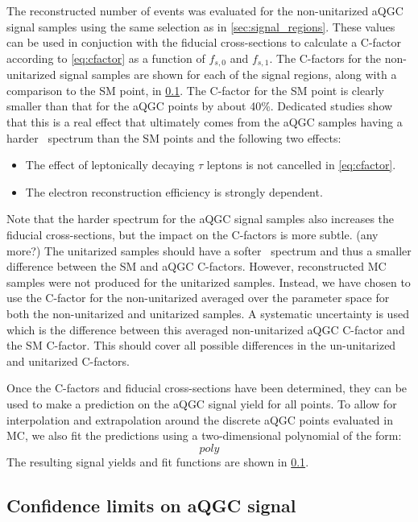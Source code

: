The reconstructed number of events was evaluated for the non-unitarized
aQGC signal samples using the same selection as in \sec\ref{sec:signal_regions}.
These values can be used in conjuction with the fiducial cross-sections
to calculate a C-factor according to \eqn\eqref{eq:cfactor} as a function 
of $f_{s,0}$ and $f_{s,1}$. The C-factors for the non-unitarized signal samples
are shown for each of the signal regions, along with a comparison to the SM point,
in \fig\ref{}.
The C-factor for the SM point is clearly smaller than that for the aQGC
points by about 40\%. Dedicated studies show that this is a real effect 
that ultimately comes from the aQGC samples having a harder \pt~spectrum
than the SM points and the following two effects:
\begin{itemize}
\item The effect of leptonically decaying $\tau$ leptons is not 
cancelled in \eqn\eqref{eq:cfactor}.
\item The electron reconstruction efficiency is strongly \pt dependent.
\end{itemize}
Note that the harder \pt spectrum for the aQGC signal samples also 
increases the fiducial cross-sections, but the impact on the C-factors is more subtle.
(any more?)
The unitarized samples should have a softer \pt~spectrum and thus a
smaller difference between the SM and aQGC C-factors. However,
reconstructed MC samples were not produced for the unitarized samples.
Instead, we have chosen to use the 
C-factor for the non-unitarized averaged over the parameter space for 
both the non-unitarized and unitarized samples.  A systematic uncertainty  
is used which is the difference between this averaged non-unitarized
aQGC C-factor and the SM C-factor. This should cover all possible differences
in the un-unitarized and unitarized C-factors.

Once the C-factors and fiducial cross-sections have been determined,
they can be used to make a prediction on the aQGC signal yield 
for all points.  To allow for interpolation and extrapolation
around the discrete aQGC points evaluated in MC, we also 
fit the predictions using a two-dimensional polynomial of 
the form:
\begin{equation}
poly
\end{equation}
The resulting signal yields and fit functions are shown in \fig\ref{}.




\subsection{Confidence limits on aQGC signal}

